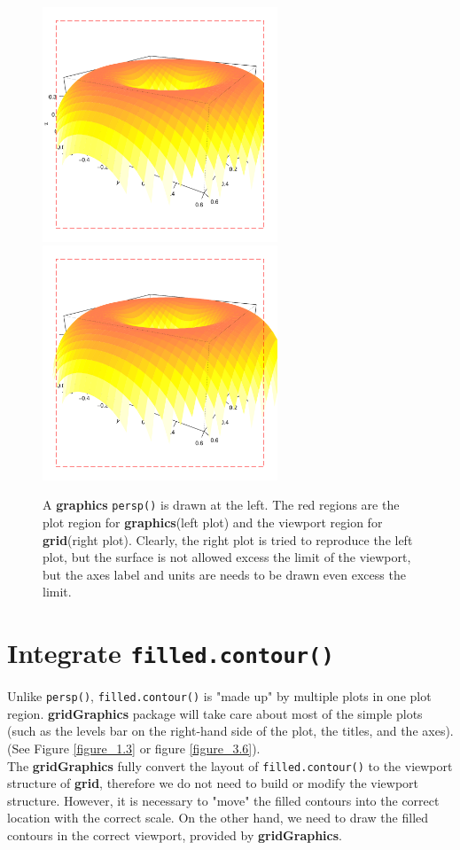 \documentclass[11pt,twoside]{report}
\begin{document}
\begin{figure}[h]
	\begin{center}
		\includegraphics[height = 7cm, width = 7cm]{figure/gridGraphics_persp_demo_viewport3_1.pdf}
		\includegraphics[height = 7cm, width = 7cm]{figure/gridGraphics_persp_demo_viewport3_2.pdf}
		\caption{A \textbf{graphics} \texttt{persp()} is drawn at the left. The red regions are the plot region for \textbf{graphics}(left plot) and the viewport region for \textbf{grid}(right plot). Clearly, the right plot is tried to reproduce the left plot, but the surface is not allowed excess the limit of the viewport, but the axes label and units are needs to be drawn even excess the limit.}
		\label{figure_4.5}
	\end{center}
\end{figure}

\section{Integrate \texttt{filled.contour()}}
Unlike \texttt{persp()}, \texttt{filled.contour()} is "made up" by multiple plots in one plot region. \textbf{gridGraphics} package will take care about most of the simple plots (such as the levels bar on the right-hand side of the plot, the titles, and the axes). (See Figure \ref{figure_1.3} or figure \ref{figure_3.6}).\\
The \textbf{gridGraphics} fully convert the layout of \texttt{filled.contour()} to the viewport structure of \textbf{grid}, therefore we do not need to build or modify the viewport structure. However, it is necessary to "move" the filled contours into the correct location with the correct scale. On the other hand, we need to draw the filled contours in the correct viewport, provided by \textbf{gridGraphics}.\\
\end{document}

